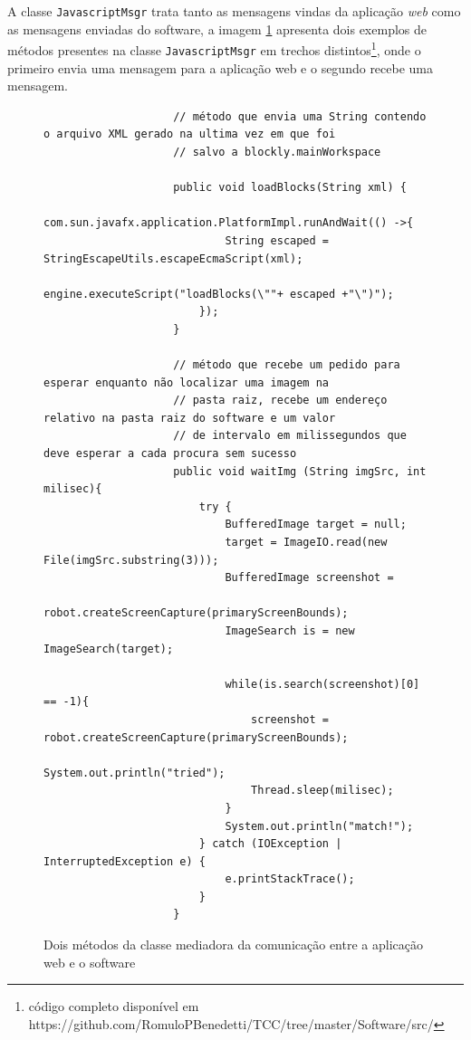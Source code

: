 \documentclass[tg]{mdtufsm}
\begin{document}
                A classe \texttt{JavascriptMsgr} trata tanto as mensagens vindas da aplicação \emph{web} como as mensagens enviadas do software, a imagem \ref{code:javascriptmsg.java} apresenta dois exemplos de métodos presentes na classe \texttt{JavascriptMsgr} em trechos distintos\footnote{código completo disponível em https://github.com/RomuloPBenedetti/TCC/tree/master/Software/src/}, onde o primeiro envia uma mensagem para a aplicação web e o segundo recebe uma mensagem.


                \begin{figure}[!htb]
                \begin{lstlisting}
                    // método que envia uma String contendo o arquivo XML gerado na ultima vez em que foi
                    // salvo a blockly.mainWorkspace

                    public void loadBlocks(String xml) {
                        com.sun.javafx.application.PlatformImpl.runAndWait(() ->{
                            String escaped = StringEscapeUtils.escapeEcmaScript(xml);
                            engine.executeScript("loadBlocks(\""+ escaped +"\")");
                        });
                    }

                    // método que recebe um pedido para esperar enquanto não localizar uma imagem na
                    // pasta raiz, recebe um endereço relativo na pasta raiz do software e um valor
                    // de intervalo em milissegundos que deve esperar a cada procura sem sucesso
                    public void waitImg (String imgSrc, int milisec){
                        try {
                            BufferedImage target = null;
                            target = ImageIO.read(new File(imgSrc.substring(3)));
                            BufferedImage screenshot =
                                robot.createScreenCapture(primaryScreenBounds);
                            ImageSearch is = new ImageSearch(target);

                            while(is.search(screenshot)[0] == -1){
                                screenshot = robot.createScreenCapture(primaryScreenBounds);
                                System.out.println("tried");
                                Thread.sleep(milisec);
                            }
                            System.out.println("match!");
                        } catch (IOException | InterruptedException e) {
                            e.printStackTrace();
                        }
                    }
                \end{lstlisting}
                    \caption{Dois métodos da classe mediadora da comunicação entre a aplicação web e o software}
                	\label{code:javascriptmsg.java}
                \end{figure}
\end{document}

